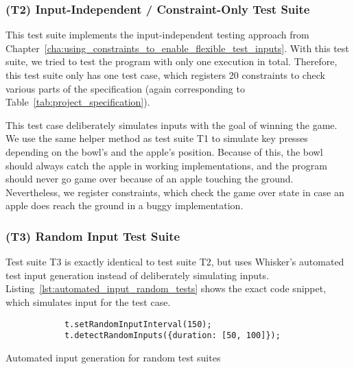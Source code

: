 \subsubsection{(T2) Input-Independent / Constraint-Only Test Suite}

This test suite implements the input-independent testing approach from Chapter~\ref{cha:using_constraints_to_enable_flexible_test_inputs}.
With this test suite, we tried to test the program with only one execution in total.
Therefore, this test suite only has one test case, which registers 20 constraints to check various parts of the specification
(again corresponding to Table~\ref{tab:project_specification}).
\parspace

This test case deliberately simulates inputs with the goal of winning the game.
We use the same helper method as test suite T1 to simulate key presses depending on the bowl's and the apple's position.
Because of this, the bowl should always catch the apple in working implementations,
and the program should never go game over because of an apple touching the ground.
Nevertheless, we register constraints, which check the game over state in case an apple does reach the ground in a buggy implementation.

\subsubsection{(T3) Random Input Test Suite}

Test suite T3 is exactly identical to test suite T2,
but uses Whisker's automated test input generation instead of deliberately simulating inputs.
Listing~\ref{lst:automated_input_random_tests} shows the exact code snippet, which simulates input for the test case.
\parspace

\begin{listing}[htpb]
    \centering
    \begin{minipage}{.45\textwidth}
        \begin{verbatim}
            t.setRandomInputInterval(150);
            t.detectRandomInputs({duration: [50, 100]});
        \end{verbatim}
    \end{minipage}
    \caption{Automated input generation for random test suites}
    \label{lst:automated_input_random_tests}
\end{listing}

